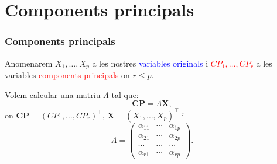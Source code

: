 \documentclass[12pt,t]{beamer}
\newcommand{\red}[1]{\textcolor{red}{#1}}
\newcommand{\blue}[1]{\textcolor{blue}{#1}}
\renewcommand{\leq}{\leqslant}
\theoremstyle{plain}
\theoremstyle{definition}
\begin{document}

\section{Components principals}
\begin{frame}
\frametitle{Components principals}

Anomenarem $X_1,\ldots,X_p$ a les nostres \blue{variables originals} i \red{$CP_1,\ldots,CP_r$} a les variables 
\red{components principals} on $r\leq p$.
\medskip

Volem calcular una matriu ${\Lambda}$ tal que:
\[
\mathbf{CP}={\Lambda}\mathbf{X},
\]
on $\mathbf{CP}=(CP_1,\ldots,CP_r)^\top$, $\mathbf{X}=(X_1,\ldots,X_p)^\top$ i 
\[
{\Lambda}=\begin{pmatrix}
\alpha_{11}&\cdots & \alpha_{1p}\\
\alpha_{21}&\cdots & \alpha_{2p}\\
\cdots & \cdots & \cdots \\
\alpha_{r1}&\cdots & \alpha_{rp}
\end{pmatrix}.
\]
\end{frame}
\end{document}
